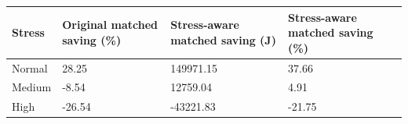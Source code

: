\begin{tabular}{llll}
\toprule
Stress & Original matched saving (\%) & Stress-aware matched saving (J) & Stress-aware matched saving (\%) \\
\midrule
Normal & 28.25 & 149971.15 & 37.66 \\
Medium & -8.54 & 12759.04 & 4.91 \\
High & -26.54 & -43221.83 & -21.75 \\
\bottomrule
\end{tabular}
